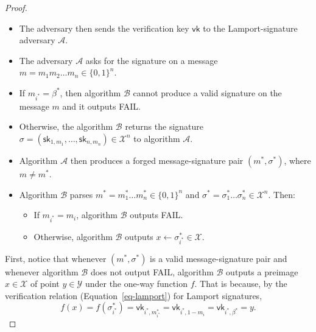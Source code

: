 \documentclass[
  letterpaper,
]{scrbook}
\providecommand{\tightlist}{%
  \setlength{\itemsep}{0pt}\setlength{\parskip}{0pt}}
\newcommand{\zo}{\{0,1\}}
\newcommand{\zon}{\{0,1\}^n}
\newcommand{\calA}{\mathcal{A}}
\newcommand{\calB}{\mathcal{B}}
\newcommand{\calX}{\mathcal{X}}
\newcommand{\calY}{\mathcal{Y}}
\newcommand{\Gen}{\mathsf{Gen}}
\newcommand{\sk}{\mathsf{sk}}
\newcommand{\vk}{\mathsf{vk}}
\newcommand{\rgetscmd}{\ooalign{$\leftarrow$\cr
    \hidewidth\raisebox{1.2\height}{\scalebox{0.5}{\ \textrm{R}}}\hidewidth\cr}}
\newcommand{\rgets}{\mathrel{\mathpalette\rgetscmd\relax}}
\newcommand{\getsr}{\rgets}
\theoremstyle{definition}
\theoremstyle{plain}
\theoremstyle{plain}
\theoremstyle{remark}
\begin{document}
\begin{proof}
\begin{itemize}
  \begin{itemize}
  \tightlist
  \item
    It runs the key-generation algorithm for the Lamport signature
    scheme \((\sk, \vk) \gets \Gen()\).
  \item
    The adversary chooses a random value \(i^* \getsr \{1, \dots, n\}\)
    and a random bit \(\beta^* \getsr \zo\).
  \item
    The adversary sets \(\vk_{i^*,\beta^*} \gets y\). That is, it
    inserts the one-way-function point it must invert into a random
    location in the verification key.
  \end{itemize}
\item
  The adversary then sends the verification key \(\vk\) to the
  Lamport-signature adversary \(\calA\).
\item
  The adversary \(\calA\) asks for the signature on a message
  \(m = m_1 m_2 \dots m_n \in \zon\).
\item
  If \(m_{i^*} = \beta^*\), then algorithm \(\calB\) cannot produce a
  valid signature on the message \(m\) and it outputs FAIL.
\item
  Otherwise, the algorithm \(\calB\) returns the signature
  \(\sigma = (\sk_{1,m_1}, \dots, \sk_{n,m_n}) \in \calX^n\) to
  algorithm \(\calA\).
\item
  Algorithm \(\calA\) then produces a forged message-signature pair
  \((m^*, \sigma^*)\), where \(m \neq m^*\).
\item
  Algorithm \(\calB\) parses \(m^* = m^*_1 \dots m^*_n \in \zon\) and
  \(\sigma^* = \sigma^*_1 \dots \sigma^*_n \in \calX^n\). Then:

  \begin{itemize}
  \tightlist
  \item
    If \(m_{i^*} = m_i\), algorithm \(\calB\) outputs FAIL.
  \item
    Otherwise, algorithm \(\calB\) outputs
    \(x \gets \sigma^*_{i^*} \in \calX\).
  \end{itemize}
\end{itemize}

First, notice that whenever \((m^*, \sigma^*)\) is a valid
message-signature pair and whenever algorithm \(\calB\) does not output
FAIL, algorithm \(\calB\) outputs a preimage \(x \in \calX\) of point
\(y \in \calY\) under the one-way function \(f\). That is because, by
the verification relation (Equation~\ref{eq-lamport}) for Lamport
signatures,
\[f(x) = f(\sigma^*_{i^*}) = \vk_{i^*,m^*_{i^*}} = \vk_{i^*, 1 - m_i} = \vk_{i^*, \beta^*} = y.\]


\end{proof}
\end{document}
